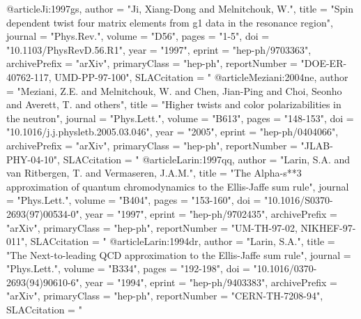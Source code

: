 @article{Ji:1997gs,
      author         = "Ji, Xiang-Dong and Melnitchouk, W.",
      title          = "{Spin dependent twist four matrix elements from g1 data
                        in the resonance region}",
      journal        = "Phys.Rev.",
      volume         = "D56",
      pages          = "1-5",
      doi            = "10.1103/PhysRevD.56.R1",
      year           = "1997",
      eprint         = "hep-ph/9703363",
      archivePrefix  = "arXiv",
      primaryClass   = "hep-ph",
      reportNumber   = "DOE-ER-40762-117, UMD-PP-97-100",
      SLACcitation   = "%
}
@article{Meziani:2004ne,
      author         = "Meziani, Z.E. and Melnitchouk, W. and Chen, Jian-Ping and
                        Choi, Seonho and Averett, T. and others",
      title          = "{Higher twists and color polarizabilities in the
                        neutron}",
      journal        = "Phys.Lett.",
      volume         = "B613",
      pages          = "148-153",
      doi            = "10.1016/j.j.physletb.2005.03.046",
      year           = "2005",
      eprint         = "hep-ph/0404066",
      archivePrefix  = "arXiv",
      primaryClass   = "hep-ph",
      reportNumber   = "JLAB-PHY-04-10",
      SLACcitation   = "%
}
@article{Larin:1997qq,
      author         = "Larin, S.A. and van Ritbergen, T. and Vermaseren, J.A.M.",
      title          = "{The Alpha-s**3 approximation of quantum chromodynamics
                        to the Ellis-Jaffe sum rule}",
      journal        = "Phys.Lett.",
      volume         = "B404",
      pages          = "153-160",
      doi            = "10.1016/S0370-2693(97)00534-0",
      year           = "1997",
      eprint         = "hep-ph/9702435",
      archivePrefix  = "arXiv",
      primaryClass   = "hep-ph",
      reportNumber   = "UM-TH-97-02, NIKHEF-97-011",
      SLACcitation   = "%
}
@article{Larin:1994dr,
      author         = "Larin, S.A.",
      title          = "{The Next-to-leading QCD approximation to the Ellis-Jaffe
                        sum rule}",
      journal        = "Phys.Lett.",
      volume         = "B334",
      pages          = "192-198",
      doi            = "10.1016/0370-2693(94)90610-6",
      year           = "1994",
      eprint         = "hep-ph/9403383",
      archivePrefix  = "arXiv",
      primaryClass   = "hep-ph",
      reportNumber   = "CERN-TH-7208-94",
      SLACcitation   = "%
}
